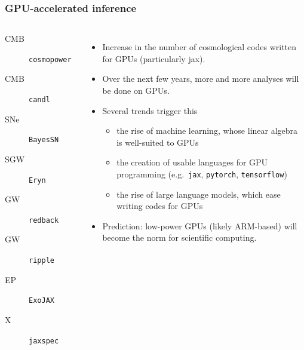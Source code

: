 \documentclass[aspectratio=169]{beamer}
\begin{document}
\begin{frame}
    \frametitle{GPU-accelerated inference}
    \begin{columns}
        \begin{description}
            \item[CMB] \texttt{cosmopower}~
            \item[CMB] \texttt{candl}~
            \item[SNe] \texttt{BayesSN}~
            \item[SGW]  \texttt{Eryn}~
            \item[GW] \texttt{redback}~
            \item[GW] \texttt{ripple}~
            \item[EP] \texttt{ExoJAX}~
            \item[X]  \texttt{jaxspec}~
        \end{description}
        \begin{itemize}
            \item Increase in the number of cosmological codes written for GPUs (particularly jax).
            \item Over the next few years, more and more analyses will be done on GPUs.
            \item Several trends trigger this
                \begin{itemize}
                    \item the rise of machine learning, whose linear algebra is well-suited to GPUs
                    \item the creation of usable languages for GPU programming (e.g.\ \texttt{jax}, \texttt{pytorch}, \texttt{tensorflow})
                    \item the rise of large language models, which ease writing codes for GPUs
                \end{itemize}
            \item Prediction: low-power GPUs (likely ARM-based) will become the norm for scientific computing.
        \end{itemize}
    \end{columns}
\end{frame}
\end{document}
